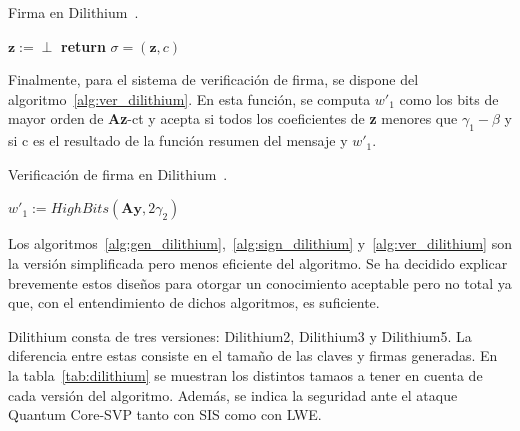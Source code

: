 \begin{algorithm}
    \caption{Firma en Dilithium~\cite{dilithium_spec}.}
    \label{alg:sign_dilithium}
    \hspace{2mm}$\textbf{z} := \perp$\newline
    \textbf{return} $\sigma = (\textbf{z}, c)$
\end{algorithm}

Finalmente, para el sistema de verificación de firma, se dispone del algoritmo~\ref{alg:ver_dilithium}.
En esta función, se computa ${w'}_1$ como los bits de mayor orden de \textbf{Az}-ct y acepta si todos los coeficientes de \textbf{z} menores que $\gamma_1 - \beta$ y si c es el resultado de la función resumen del mensaje y ${w'}_1$.

\begin{algorithm}
    \caption{Verificación de firma en Dilithium~\cite{dilithium_spec}.}
    \label{alg:ver_dilithium}
    \hspace{2mm}${w'}_1 := HighBits(\textbf{Ay}, 2\gamma_2)$\newline
\end{algorithm}

Los algoritmos~\ref{alg:gen_dilithium},~\ref{alg:sign_dilithium} y~\ref{alg:ver_dilithium} son la versión simplificada pero menos eficiente del algoritmo.
Se ha decidido explicar brevemente estos diseños para otorgar un conocimiento aceptable pero no total ya que, con el entendimiento de dichos algoritmos, es suficiente.

Dilithium consta de tres versiones: Dilithium2, Dilithium3 y Dilithium5.
La diferencia entre estas consiste en el tamaño de las claves y firmas generadas.
En la tabla~\ref{tab:dilithium} se muestran los distintos tamaos a tener en cuenta de cada versión del algoritmo.
Además, se indica la seguridad ante el ataque Quantum Core-SVP tanto con \ac{SIS} como con \ac{LWE}.

